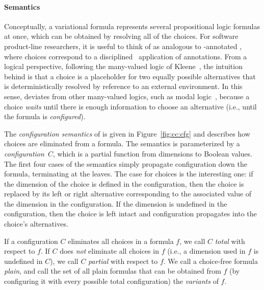 \paragraph{Semantics}
%
Conceptually, a variational formula represents several propositional logic
formulas at once, which can be obtained by resolving all of the choices. For
software product-line researchers, it is useful to think of \vpl{} as analogous
to -annotated \pl{}, where choices correspond to a
disciplined~\cite{LKA:AOSD11} application of  annotations.
%
From a logical perspective, following the many-valued logic of
Kleene~\cite{kleene1968introduction,Rescher1969-RESML}, the intuition behind
\vpl{} is that a choice is a placeholder for two equally possible alternatives
that is deterministically resolved by reference to an external environment.
%
In this sense, \vpl{} deviates from other many-valued logics, such as modal
logic~\cite{sep-logic-modal}, because a choice \emph{waits} until there is
enough information to choose an alternative (i.e., until the formula is
\emph{configured}).


The \emph{configuration semantics} of \vpl{} is given in
Figure~\ref{fig:cc:cfg} and describes how choices are eliminated from a
formula. The semantics is parameterized by a \emph{configuration}\ $C$, which is
a partial function from dimensions to Boolean values.
%
The first four cases of the semantics simply propagate configuration down the
formula, terminating at the leaves. The case for choices is the interesting one:
if the dimension of the choice is defined in the configuration, then the choice
is replaced by its left or right alternative corresponding to the associated
value of the dimension in the configuration. If the dimension is undefined in
the configuration, then the choice is left intact and configuration propagates
into the choice's alternatives.


If a configuration $C$ eliminates all choices in a formula $f$, we call $C$
\emph{total} with respect to $f$. If $C$ does \emph{not} eliminate all choices
in $f$ (i.e., a dimension used in $f$ is undefined in $C$), we call $C$
\emph{partial} with respect to $f$.
%
We call a choice-free formula \emph{plain}, and call the set of all plain
formulas that can be obtained from $f$ (by configuring it with every possible
total configuration) the \emph{variants} of $f$.


